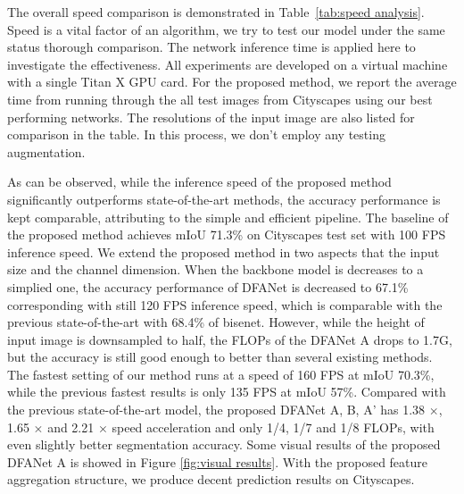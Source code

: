 \documentclass[10pt,twocolumn,letterpaper]{article}
\begin{document}
The overall speed comparison is demonstrated in Table~\ref{tab:speed analysis}. Speed is a vital factor of an algorithm, we try to test our model under the same status thorough comparison. The network inference time is applied here to investigate the effectiveness. All experiments are developed on a virtual machine with a single Titan X GPU card. For the proposed method, we report the average time from running through the all test images from Cityscapes using our best performing networks. The resolutions of the input image are also listed for comparison in the table. In this process, we don't employ any testing augmentation.

As can be observed, while the inference speed of the proposed method significantly outperforms state-of-the-art methods, the accuracy performance is kept comparable, attributing to the simple and efficient pipeline. The baseline of the proposed method achieves mIoU 71.3\% on Cityscapes test set with 100 FPS inference speed. We extend the proposed method in two aspects that the input size and the channel dimension. When the backbone model is decreases to a simplied one, the accuracy performance of DFANet is decreased to 67.1\% corresponding with still 120 FPS inference speed, which is comparable with the previous state-of-the-art with 68.4\% of bisenet\cite{BiSeNet}. However, while the height of input image is downsampled to half, the FLOPs of the DFANet A drops to 1.7G, but the accuracy is still good enough to better than several existing methods. The fastest setting of our method runs at a speed of 160 FPS at mIoU 70.3\%, while the previous fastest results\cite{enet} is only 135 FPS at mIoU 57\%. Compared with the previous state-of-the-art model\cite{BiSeNet}, the proposed DFANet A, B, A' has 1.38 $\times$, 1.65 $\times$ and 2.21 $\times$ speed acceleration and only 1/4, 1/7 and 1/8 FLOPs, with even slightly better segmentation accuracy. Some visual results of the proposed DFANet A is showed in Figure \ref{fig:visual results}. With the proposed feature aggregation structure, we produce decent prediction results on Cityscapes. 
\end{document}
